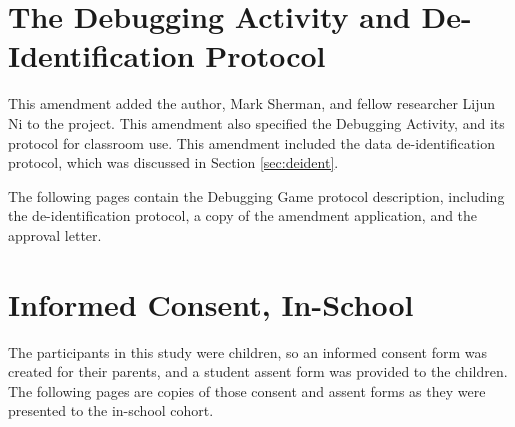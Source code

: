 % 
% 

\section{The Debugging Activity and De-Identification Protocol}
This amendment added the author, Mark Sherman, and fellow researcher Lijun Ni to the project. This amendment also specified the Debugging Activity, and its protocol for classroom use. This amendment included the data de-identification protocol, which was discussed in Section \ref{sec:deident}.

The following pages contain the Debugging Game protocol description, including the de-identification protocol, a copy of the amendment application, and the approval letter.


%

\label{IRB:deident}



% 
% 

\section{Informed Consent, In-School}
\label{sec:icf:school}
The participants in this study were children, so an informed consent form was created for their parents, and a student assent form was provided to the children. The following pages are copies of those consent and assent forms as they were presented to the in-school cohort.




